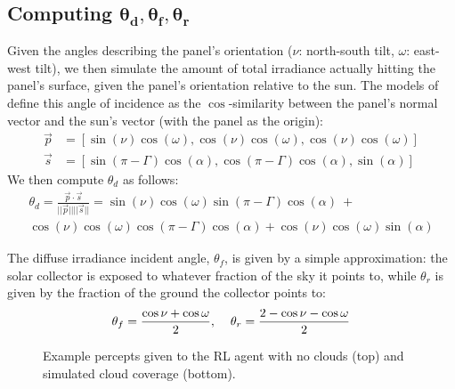\documentclass{article}
\begin{document}
{%
\subsection{Computing $\pmb{\theta_d, \theta_f, \theta_r}$}
Given the angles describing the panel's orientation ($\nu$: north-south tilt, $\omega$: east-west tilt), we then simulate the amount of total irradiance actually hitting the panel's surface, given the panel's orientation relative to the sun. The models of~\citet{masters2013renewable} define this angle of incidence as the $\cos$-similarity between the panel's normal vector and the sun's vector (with the panel as the origin):
\begin{align*}
\vec{p} &= \left[ \sin(\nu)  \cos(\omega), \cos(\nu)  \cos(\omega), \cos(\nu) \cos(\omega) \right] \\
\vec{s} &= \left[ \sin(\pi - \Gamma)  \cos(\alpha), \cos(\pi - \Gamma)  \cos(\alpha), \sin(\alpha) \right]
\end{align*}
We then compute $\theta_d$ as follows:
\begin{multline}
\theta_d = \frac{\vec{p} \cdot \vec{s}}{||\vec{p}|| ||\vec{s} ||} = \sin(\nu)  \cos(\omega)  \sin(\pi - \Gamma)  \cos(\alpha)\ + \\
\cos(\nu)  \cos(\omega)  \cos(\pi - \Gamma)  \cos(\alpha) +  \cos(\nu) \cos(\omega)  \sin(\alpha) 
\end{multline}

The diffuse irradiance incident angle, $\theta_f$, is given by a simple approximation: the solar collector is exposed to whatever fraction of the sky it points to, while $\theta_r$ is given by the fraction of the ground the collector points to:
\begin{equation}
\theta_f = \frac{\cos \nu + \cos \omega}{2}, \hspace{4mm} \theta_r = \frac{2 - \cos\nu - \cos \omega}{2}
\end{equation}

\begin{figure}[t]
\begin{center}
 \hspace{16mm} %
\caption{Example percepts given to the RL agent with no clouds (top) and simulated cloud coverage (bottom).}
\end{center}
\end{figure}


}
\end{document}
